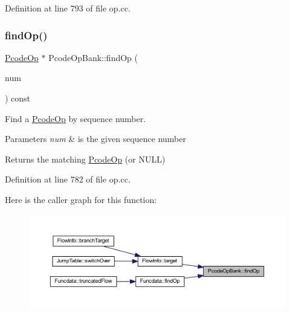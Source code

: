 Definition at line 793 of file op.\+cc.

\mbox{\label{class_pcode_op_bank_a6c9ca53e38a2c3c81dbfde410e33fd02}} 
\subsubsection{\texorpdfstring{findOp()}{findOp()}}
{\footnotesize\ttfamily \mbox{\hyperlink{class_pcode_op}{Pcode\+Op}} $\ast$ Pcode\+Op\+Bank\+::find\+Op (\begin{DoxyParamCaption}\item[{const \mbox{\hyperlink{class_seq_num}{Seq\+Num}} \&}]{num }\end{DoxyParamCaption}) const}



Find a \mbox{\hyperlink{class_pcode_op}{Pcode\+Op}} by sequence number. 


\begin{DoxyParams}{Parameters}
{\em num} & is the given sequence number \\
\hline
\end{DoxyParams}
\begin{DoxyReturn}{Returns}
the matching \mbox{\hyperlink{class_pcode_op}{Pcode\+Op}} (or N\+U\+LL) 
\end{DoxyReturn}


Definition at line 782 of file op.\+cc.

Here is the caller graph for this function\+:
\nopagebreak
\begin{figure}[H]
\begin{center}
\leavevmode
\includegraphics[width=350pt]{class_pcode_op_bank_a6c9ca53e38a2c3c81dbfde410e33fd02_icgraph}
\end{center}
\end{figure}
\mbox{\label{class_pcode_op_bank_a54e8b50b4b4c2fa1e4c4aa80d3cd6588}} 
